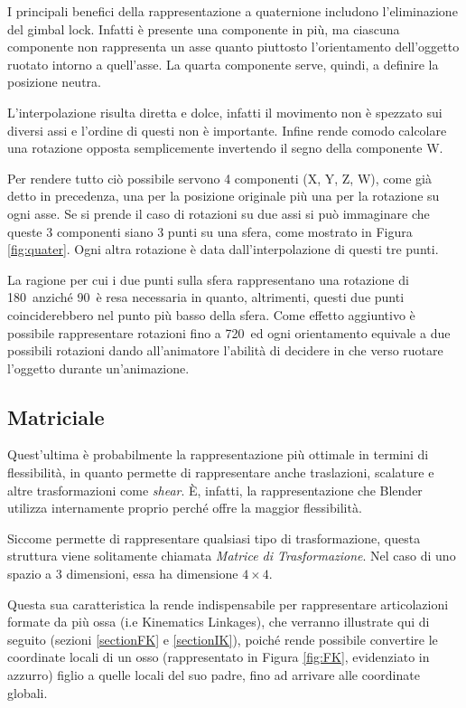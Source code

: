 I principali benefici della rappresentazione a quaternione includono l'eliminazione del gimbal lock.
Infatti è presente una componente in più, ma ciascuna componente non rappresenta un asse quanto piuttosto l'orientamento dell'oggetto ruotato intorno a quell'asse.
La quarta componente serve, quindi, a definire la posizione neutra.

L'interpolazione risulta diretta e dolce, infatti il movimento non è spezzato sui diversi assi e l'ordine di questi non è importante.
Infine rende comodo calcolare una rotazione opposta semplicemente invertendo il segno della componente W.

Per rendere tutto ciò possibile servono 4 componenti (X, Y, Z, W), come già detto in precedenza, una per la posizione originale più una per la rotazione su ogni asse. Se si prende il caso di rotazioni su due assi si può immaginare che queste 3 componenti siano 3 punti su una sfera, come mostrato in Figura \ref{fig:quater}. Ogni altra rotazione è data dall'interpolazione di questi tre punti.

La ragione per cui i due punti sulla sfera rappresentano una rotazione di 180\textdegree\ anziché 90\textdegree\ è resa necessaria in quanto, altrimenti, questi due punti coinciderebbero nel punto più basso della sfera.
Come effetto aggiuntivo è possibile rappresentare rotazioni fino a 720\textdegree\ ed ogni orientamento equivale a due possibili rotazioni dando all'animatore l'abilità di decidere in che verso ruotare l'oggetto durante un'animazione.


\subsection{Matriciale}
Quest'ultima è probabilmente la rappresentazione più ottimale in termini di flessibilità, in quanto permette di rappresentare anche traslazioni, scalature e altre trasformazioni come \emph{shear}.
È, infatti, la rappresentazione che Blender utilizza internamente \cite{blendApi} \cite{nat2012rig} proprio perché offre la maggior flessibilità.

Siccome permette di rappresentare qualsiasi tipo di trasformazione, questa struttura viene solitamente chiamata \emph{Matrice di Trasformazione}. Nel caso di uno spazio a 3 dimensioni, essa ha dimensione $4\times4$.

Questa sua caratteristica la rende indispensabile per rappresentare articolazioni formate da più ossa (i.e Kinematics Linkages), che verranno illustrate qui di seguito (sezioni \ref{sectionFK} e \ref{sectionIK}), poiché rende possibile convertire le coordinate locali di un osso (rappresentato in Figura \ref{fig:FK}, evidenziato in azzurro) figlio a quelle locali del suo padre, fino ad arrivare alle coordinate globali.

